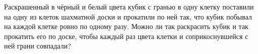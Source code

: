 Раскрашенный в чёрный и белый цвета кубик с гранью в одну клетку поставили на одну из клеток шахматной доски и прокатили по ней так, что кубик побывал на каждой клетке ровно по одному разу. Можно ли так раскрасить кубик и так прокатить его по доске, чтобы каждый раз цвета клетки и соприкоснувшейся с ней грани совпадали?